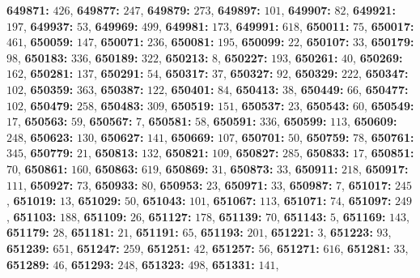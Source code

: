 \textsf{\bfseries 649871:} $426$, \textsf{\bfseries 649877:} $247$, \textsf{\bfseries 649879:} $273$, \textsf{\bfseries 649897:} $101$, \textsf{\bfseries 649907:} $82$, \textsf{\bfseries 649921:} $197$, \textsf{\bfseries 649937:} $53$, \textsf{\bfseries 649969:} $499$, \textsf{\bfseries 649981:} $173$, \textsf{\bfseries 649991:} $618$, \textsf{\bfseries 650011:} $75$, \textsf{\bfseries 650017:} $461$, \textsf{\bfseries 650059:} $147$, \textsf{\bfseries 650071:} $236$, \textsf{\bfseries 650081:} $195$, \textsf{\bfseries 650099:} $22$, \textsf{\bfseries 650107:} $33$, \textsf{\bfseries 650179:} $98$, \textsf{\bfseries 650183:} $336$, \textsf{\bfseries 650189:} $322$, \textsf{\bfseries 650213:} $8$, \textsf{\bfseries 650227:} $193$, \textsf{\bfseries 650261:} $40$, \textsf{\bfseries 650269:} $162$, \textsf{\bfseries 650281:} $137$, \textsf{\bfseries 650291:} $54$, \textsf{\bfseries 650317:} $37$, \textsf{\bfseries 650327:} $92$, \textsf{\bfseries 650329:} $222$, \textsf{\bfseries 650347:} $102$, \textsf{\bfseries 650359:} $363$, \textsf{\bfseries 650387:} $122$, \textsf{\bfseries 650401:} $84$, \textsf{\bfseries 650413:} $38$, \textsf{\bfseries 650449:} $66$, \textsf{\bfseries 650477:} $102$, \textsf{\bfseries 650479:} $258$, \textsf{\bfseries 650483:} $309$, \textsf{\bfseries 650519:} $151$, \textsf{\bfseries 650537:} $23$, \textsf{\bfseries 650543:} $60$, \textsf{\bfseries 650549:} $17$, \textsf{\bfseries 650563:} $59$, \textsf{\bfseries 650567:} $7$, \textsf{\bfseries 650581:} $58$, \textsf{\bfseries 650591:} $336$, \textsf{\bfseries 650599:} $113$, \textsf{\bfseries 650609:} $248$, \textsf{\bfseries 650623:} $130$, \textsf{\bfseries 650627:} $141$, \textsf{\bfseries 650669:} $107$, \textsf{\bfseries 650701:} $50$, \textsf{\bfseries 650759:} $78$, \textsf{\bfseries 650761:} $345$, \textsf{\bfseries 650779:} $21$, \textsf{\bfseries 650813:} $132$, \textsf{\bfseries 650821:} $109$, \textsf{\bfseries 650827:} $285$, \textsf{\bfseries 650833:} $17$, \textsf{\bfseries 650851:} $70$, \textsf{\bfseries 650861:} $160$, \textsf{\bfseries 650863:} $619$, \textsf{\bfseries 650869:} $31$, \textsf{\bfseries 650873:} $33$, \textsf{\bfseries 650911:} $218$, \textsf{\bfseries 650917:} $111$, \textsf{\bfseries 650927:} $73$, \textsf{\bfseries 650933:} $80$, \textsf{\bfseries 650953:} $23$, \textsf{\bfseries 650971:} $33$, \textsf{\bfseries 650987:} $7$, \textsf{\bfseries 651017:} $245$, \textsf{\bfseries 651019:} $13$, \textsf{\bfseries 651029:} $50$, \textsf{\bfseries 651043:} $101$, \textsf{\bfseries 651067:} $113$, \textsf{\bfseries 651071:} $74$, \textsf{\bfseries 651097:} $249$, \textsf{\bfseries 651103:} $188$, \textsf{\bfseries 651109:} $26$, \textsf{\bfseries 651127:} $178$, \textsf{\bfseries 651139:} $70$, \textsf{\bfseries 651143:} $5$, \textsf{\bfseries 651169:} $143$, \textsf{\bfseries 651179:} $28$, \textsf{\bfseries 651181:} $21$, \textsf{\bfseries 651191:} $65$, \textsf{\bfseries 651193:} $201$, \textsf{\bfseries 651221:} $3$, \textsf{\bfseries 651223:} $93$, \textsf{\bfseries 651239:} $651$, \textsf{\bfseries 651247:} $259$, \textsf{\bfseries 651251:} $42$, \textsf{\bfseries 651257:} $56$, \textsf{\bfseries 651271:} $616$, \textsf{\bfseries 651281:} $33$, \textsf{\bfseries 651289:} $46$, \textsf{\bfseries 651293:} $248$, \textsf{\bfseries 651323:} $498$, \textsf{\bfseries 651331:} $141$, 
